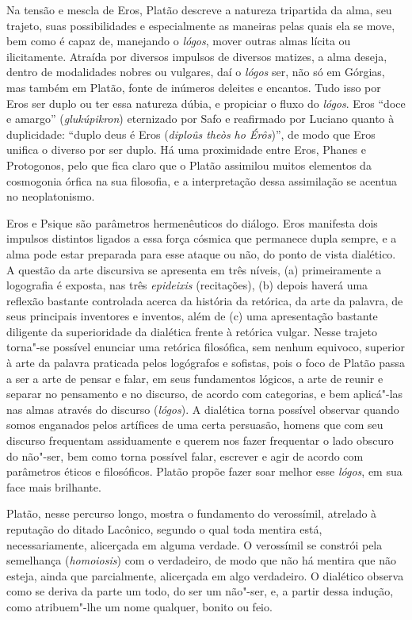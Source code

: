 Na tensão e mescla de Eros, Platão descreve a natureza tripartida da
alma, seu trajeto, suas possibilidades e especialmente as maneiras pelas
quais ela se move, bem como é capaz de, manejando o \emph{lógos}, mover
outras almas lícita ou ilicitamente. Atraída por diversos impulsos de
diversos matizes, a alma deseja, dentro de modalidades nobres ou
vulgares, daí o \emph{lógos} ser, não só em Górgias, mas também em
Platão, fonte de inúmeros deleites e encantos. Tudo isso por Eros ser
duplo ou ter essa natureza dúbia, e propiciar o fluxo do \emph{lógos}.
Eros ``doce e amargo'' (\emph{glukúpikron}) eternizado por Safo e
reafirmado por Luciano quanto à duplicidade: ``duplo deus é Eros
(\emph{diploûs theòs ho Érôs})'', de modo que Eros unifica o diverso por
ser duplo. Há uma proximidade entre Eros, Phanes e Protogonos, pelo que
fica claro que o Platão assimilou muitos elementos da cosmogonia órfica
na sua filosofia, e a interpretação dessa assimilação se acentua no
neoplatonismo.

Eros e Psique são parâmetros hermenêuticos do diálogo. Eros manifesta
dois impulsos distintos ligados a essa força cósmica que permanece dupla
sempre, e a alma pode estar preparada para esse ataque ou não, do ponto
de vista dialético. A questão da arte discursiva se apresenta em três
níveis, (a) primeiramente a logografia é exposta, nas
três \emph{epideixis }(recitações), (b) depois haverá uma reflexão
bastante controlada acerca da história da retórica, da arte da palavra,
de seus principais inventores e inventos, além de (c) uma apresentação
bastante diligente da superioridade da dialética frente à retórica
vulgar. Nesse trajeto torna"-se possível enunciar uma retórica
filosófica, sem nenhum equivoco, superior à arte da palavra praticada
pelos logógrafos e sofistas, pois o foco de Platão passa a ser a arte de
pensar e falar, em seus fundamentos lógicos, a arte de reunir e separar
no pensamento e no discurso, de acordo com categorias, e bem aplicá"-las
nas almas através do discurso (\emph{lógos}). A dialética torna possível
observar quando somos enganados pelos artífices de uma certa persuasão,
homens que com seu discurso frequentam assiduamente e querem nos fazer
frequentar o lado obscuro do não"-ser, bem como torna possível falar,
escrever e agir de acordo com parâmetros éticos e filosóficos. Platão
propõe fazer soar melhor esse \emph{lógos}, em sua face mais brilhante.

Platão, nesse percurso longo, mostra o fundamento do verossímil,
atrelado à reputação do ditado Lacônico, segundo o qual toda mentira
está, necessariamente, alicerçada em alguma verdade. O verossímil se
constrói pela semelhança (\emph{homoiosis}) com o verdadeiro, de modo
que não há mentira que não esteja, ainda que parcialmente, alicerçada em
algo verdadeiro. O dialético observa como se deriva da parte um todo, do
ser um não"-ser, e, a partir dessa indução, como atribuem"-lhe um nome
qualquer, bonito ou feio.

